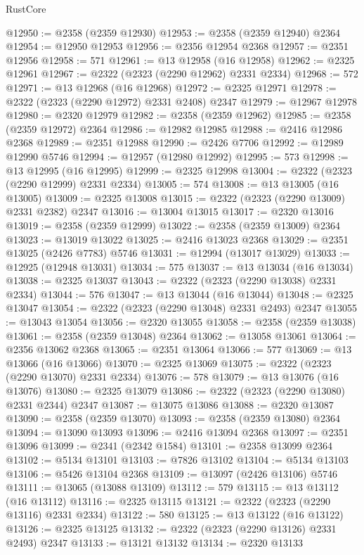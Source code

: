 \begin{lexlean}{RustCore}
\begin{coremodule}
@12950 := @2358 (@2359 @12930)
@12953 := @2358 (@2359 @12940) @2364
@12954 := @12950 @12953
@12956 := @2356 @12954 @2368
@12957 := @2351 @12956
@12958 := 571
@12961 := @13 @12958 (@16 @12958)
@12962 := @2325 @12961
@12967 := @2322 (@2323 (@2290 @12962) @2331 @2334)
@12968 := 572
@12971 := @13 @12968 (@16 @12968)
@12972 := @2325 @12971
@12978 := @2322 (@2323 (@2290 @12972) @2331 @2408) @2347
@12979 := @12967 @12978
@12980 := @2320 @12979
@12982 := @2358 (@2359 @12962)
@12985 := @2358 (@2359 @12972) @2364
@12986 := @12982 @12985
@12988 := @2416 @12986 @2368
@12989 := @2351 @12988
@12990 := @2426 @7706
@12992 := @12989 @12990 @5746
@12994 := @12957 (@12980 @12992)
@12995 := 573
@12998 := @13 @12995 (@16 @12995)
@12999 := @2325 @12998
@13004 := @2322 (@2323 (@2290 @12999) @2331 @2334)
@13005 := 574
@13008 := @13 @13005 (@16 @13005)
@13009 := @2325 @13008
@13015 := @2322 (@2323 (@2290 @13009) @2331 @2382) @2347
@13016 := @13004 @13015
@13017 := @2320 @13016
@13019 := @2358 (@2359 @12999)
@13022 := @2358 (@2359 @13009) @2364
@13023 := @13019 @13022
@13025 := @2416 @13023 @2368
@13029 := @2351 @13025 (@2426 @7783) @5746
@13031 := @12994 (@13017 @13029)
@13033 := @12925 (@12948 @13031)
@13034 := 575
@13037 := @13 @13034 (@16 @13034)
@13038 := @2325 @13037
@13043 := @2322 (@2323 (@2290 @13038) @2331 @2334)
@13044 := 576
@13047 := @13 @13044 (@16 @13044)
@13048 := @2325 @13047
@13054 := @2322 (@2323 (@2290 @13048) @2331 @2493) @2347
@13055 := @13043 @13054
@13056 := @2320 @13055
@13058 := @2358 (@2359 @13038)
@13061 := @2358 (@2359 @13048) @2364
@13062 := @13058 @13061
@13064 := @2356 @13062 @2368
@13065 := @2351 @13064
@13066 := 577
@13069 := @13 @13066 (@16 @13066)
@13070 := @2325 @13069
@13075 := @2322 (@2323 (@2290 @13070) @2331 @2334)
@13076 := 578
@13079 := @13 @13076 (@16 @13076)
@13080 := @2325 @13079
@13086 := @2322 (@2323 (@2290 @13080) @2331 @2344) @2347
@13087 := @13075 @13086
@13088 := @2320 @13087
@13090 := @2358 (@2359 @13070)
@13093 := @2358 (@2359 @13080) @2364
@13094 := @13090 @13093
@13096 := @2416 @13094 @2368
@13097 := @2351 @13096
@13099 := @2341 (@2342 @1584)
@13101 := @2358 @13099 @2364
@13102 := @5134 @13101
@13103 := @7826 @13102
@13104 := @5134 @13103
@13106 := @5426 @13104 @2368
@13109 := @13097 (@2426 @13106) @5746
@13111 := @13065 (@13088 @13109)
@13112 := 579
@13115 := @13 @13112 (@16 @13112)
@13116 := @2325 @13115
@13121 := @2322 (@2323 (@2290 @13116) @2331 @2334)
@13122 := 580
@13125 := @13 @13122 (@16 @13122)
@13126 := @2325 @13125
@13132 := @2322 (@2323 (@2290 @13126) @2331 @2493) @2347
@13133 := @13121 @13132
@13134 := @2320 @13133

\end{coremodule}
\end{lexlean}
